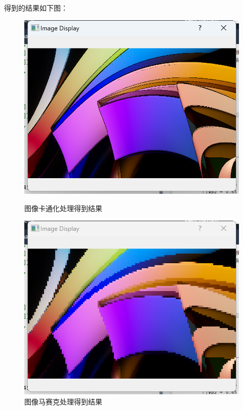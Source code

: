 \documentclass[a4paper,12pt]{article}
\begin{document}
得到的结果如下图：
\begin{figure}[h!]
    \centering
    \begin{minipage}[b]{0.48\textwidth}
        \centering
        \includegraphics[width=\linewidth]{images/Design/image_processing/3/carton.png}
        \caption{图像卡通化处理得到结果}
    \end{minipage}
    \hfill
    \begin{minipage}[b]{0.48\textwidth}
        \centering
        \includegraphics[width=\linewidth]{images/Design/image_processing/3/mosaic.png}
        \caption{图像马赛克处理得到结果}
    \end{minipage}
    

\end{figure}
\end{document}
